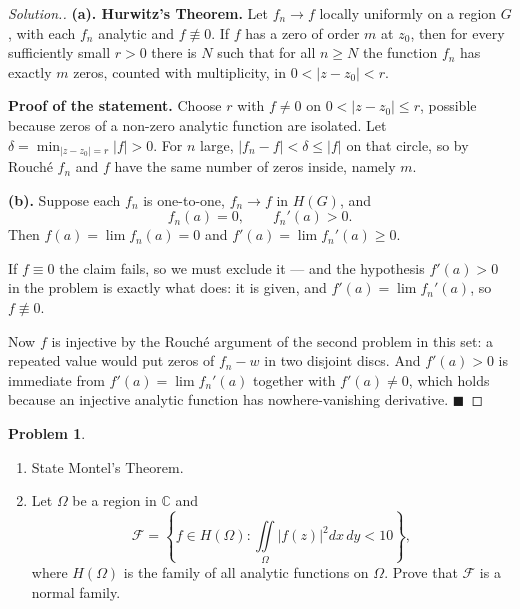 \documentclass[11pt,a4paper]{article}
\theoremstyle{definition}
\newtheorem{problemx}{Problem}[section]
\newenvironment{problem}{\begin{problemx}}{\end{problemx}}
\newenvironment{solution}
  {\renewcommand{\qedsymbol}{}\begin{proof}[\textit{Solution}.]}
  {\end{proof}}
\begin{document}
\begin{solution}
\textbf{(a). Hurwitz's Theorem.} Let $f_n \rightarrow f$ locally uniformly on a
region $G$, with each $f_n$ analytic and $f \not\equiv 0$. If $f$ has a zero of
order $m$ at $z_0$, then for every sufficiently small $r > 0$ there is $N$ such
that for all $n \geq N$ the function $f_n$ has exactly $m$ zeros, counted with
multiplicity, in $0 < \left|z - z_0\right| < r$.

\textbf{Proof of the statement.} Choose $r$ with $f \neq 0$ on
$0 < \left|z-z_0\right| \leq r$, possible because zeros of a non-zero analytic
function are isolated. Let $\delta = \min_{\left|z-z_0\right|=r}\left|f\right| > 0$.
For $n$ large, $\left|f_n - f\right| < \delta \leq \left|f\right|$ on that circle,
so by Rouch\'e $f_n$ and $f$ have the same number of zeros inside, namely $m$.

\textbf{(b).} Suppose each $f_n$ is one-to-one, $f_n \rightarrow f$ in $H(G)$, and
$$f_n(a) = 0,\qquad f_n'(a) > 0 .$$
Then $f(a) = \lim f_n(a) = 0$ and $f'(a) = \lim f_n'(a) \geq 0$.

If $f \equiv 0$ the claim fails, so we must exclude it --- and the hypothesis
$f'(a) > 0$ in the problem is exactly what does: it is given, and
$f'(a) = \lim f_n'(a)$, so $f \not\equiv 0$.

Now $f$ is injective by the Rouch\'e argument of the second problem in this set: a
repeated value would put zeros of $f_n - w$ in two disjoint discs. And
$f'(a) > 0$ is immediate from $f'(a) = \lim f_n'(a)$ together with
$f' (a) \neq 0$, which holds because an injective analytic function has
nowhere-vanishing derivative. $\blacksquare$
\end{solution}


\begin{problem}
\begin{enumerate}
\item[(a).] State Montel's Theorem.
\item[(b).] Let $\Omega$ be a region in $\mathbb{C}$ and
$$\mathcal{F} = \left\{ f \in H(\Omega) :
\iint\limits_{\Omega}\left|f(z)\right|^{2}dx\,dy < 10 \right\},$$
where $H(\Omega)$ is the family of all analytic functions on $\Omega$. Prove that
$\mathcal{F}$ is a normal family.
\end{enumerate}
\end{problem}
\end{document}
